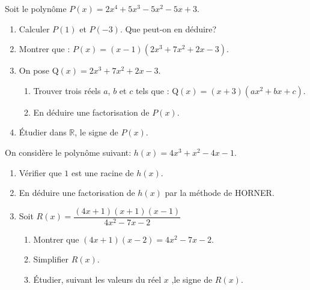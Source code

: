 \begin{exercice}
Soit le polynôme   $P(x) = 2x^4 + 5x^3 -5x^2 -5x + 3 $.
\begin{enumerate}
\item  Calculer  $ P(1) $ et $ P(-3) $. Que peut-on en déduire?
\item Montrer que : $ P(x)=(x-1)(2x^3+7x^2+2x-3)$.
\item On pose Q$(x)= 2x^3+7x^2+2x-3 $.
\begin{enumerate}
 \item Trouver trois réels $ a $, $ b$ et $c$  tels que : Q$(x)=(x+3)(ax^2+bx+c)$. 
\item En déduire une  factorisation  de $ P(x) $.
\end{enumerate} 

\item  Étudier dans $ \mathbb{R} $, le signe de    $P(x)  $.
\end{enumerate}

\end{exercice}
\begin{exercice}
On considère le polynôme  suivant:\; $ h(x)=4x^3+x^2-4x-1 $.

\begin{enumerate}
\item Vérifier que  $ 1 $ est une racine de  $ h(x)$. 
\item En déduire  une factorisation de  $ h(x)$  par la méthode de HORNER.
\item Soit\;  $ R(x)=\dfrac{(4x+1)(x+1)(x-1)}{4x^2-7x-2} $
\begin{enumerate}
\item Montrer que \; $(4x+1)(x-2)=4x^2-7x-2$. 
\item Simplifier \; $  R(x) $. 
\item  Étudier, suivant les valeurs du réel $ x $ ,le signe de $ R(x)$. 
\end{enumerate}
\end{enumerate}

\end{exercice}
